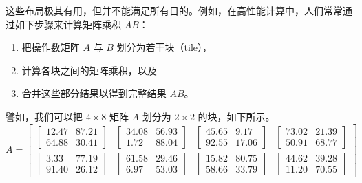 \noindent 这些布局极其有用，但并不能满足所有目的。例如，在高性能计算中，人们常常通过如下步骤来计算矩阵乘积 $AB$：
\begin{enumerate}
    \item 把操作数矩阵 $A$ 与 $B$ 划分为若干块（tile），
    \item 计算各块之间的矩阵乘积，以及
    \item 合并这些部分结果以得到完整结果 $AB$。
\end{enumerate}
譬如，我们可以把 $4 \times 8$ 矩阵 $A$ 划分为 $2 \times 2$ 的块，如下所示。
\[
A = \left[\begin{array}{cccc}
\begin{bmatrix}
12.47 & 87.21 \\
64.88 & 30.41
\end{bmatrix}
&
\begin{bmatrix}
34.08 & 56.93 \\
1.72 & 88.04
\end{bmatrix}
&
\begin{bmatrix}
45.65 &  9.17 \\
92.55 & 17.06
\end{bmatrix}
&
\begin{bmatrix}
73.02 & 21.39 \\
50.91 & 68.77
\end{bmatrix}
\\[2ex]
\begin{bmatrix}
 3.33 & 77.19 \\
 91.40 & 26.12
\end{bmatrix}
&
\begin{bmatrix}
 61.58 & 29.46 \\
6.97 & 53.03
\end{bmatrix}
&
\begin{bmatrix}
 15.82 & 80.75 \\
58.66 & 33.79
\end{bmatrix}
&
\begin{bmatrix}
 44.62 & 39.28 \\
11.20 & 70.55
\end{bmatrix}
\end{array}\right]
\]

